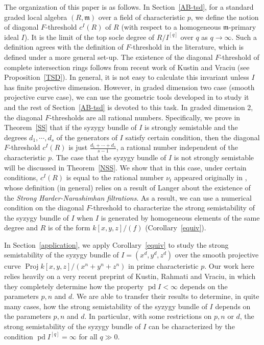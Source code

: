 \documentclass[draft]{amsart}
\theoremstyle{definition}
\numberwithin{equation}{theorem}
\begin{document}
The organization of this paper is as follows. In Section~\ref{AB-tsd}, for a standard graded local algebra $(R, {\mathfrak{m}})$ over a field of characteristic $p$, we define the notion of diagonal $F$-threshold $c^I(R)$ of $R$ (with respect to a homogeneous ${\mathfrak{m}}$-primary ideal $I$). It is the limit of the top socle degree of $R/I^{[q]}$ over $q$ as $q \to {{\infty}}$. Such a definition agrees with the definition of $F$-threshold in the literature, which is defined under a more general set-up. The existence of the diagonal $F$-threshold of complete intersection rings follows from recent work of Kustin and Vraciu (see Proposition~\ref{TSD}). In general, it is not easy to calculate this invariant unless $I$ has finite projective dimension. However, in graded dimension two case (smooth projective curve case), we can use the geometric tools developed in \cite{B2} to study it and the rest of Section~\ref{AB-tsd} is devoted to this task. In graded dimension 2, the diagonal $F$-thresholds are all rational numbers. Specifically, we prove in Theorem~\ref{SS} that if the syzygy bundle of $I$ is strongly semistable and the degrees $d_1, \cdots, d_s$ of the generators of $I$ satisfy certain condition, then the diagonal $F$-threshold $c^I(R)$ is just $\frac{d_1+\cdots + d_s}{s-1}$, a rational number independent of the characteristic $p$. The case that the syzygy bundle of $I$ is not strongly semistable will be discussed in Theorem~\ref{NSS}. We show that in this case, under certain conditions, $c^I(R)$ is equal to the rational number $\nu_t$ appeared originally in \cite{B2},  whose definition (in general) relies on a result of Langer about the existence of the \textit{Strong Harder-Narashimhan filtrations}. As a result, we can use a numerical condition on the diagonal $F$-threshold to characterize the strong semistability of the syzygy bundle of $I$ when $I$ is generated by homogeneous elements of the same degree and $R$ is of the form $k[x,y,z]/(f)$ (Corollary~\ref{equiv}).

In Section~\ref{application}, we apply Corollary~\ref{equiv} to study the strong semistability of the syzygy bundle of $I=(x^d, y^d,z^d)$ over the smooth projective curve ${\mathop{\mathrm{Proj}}\nolimits} k[x,y,z]/(x^n+y^n+z^n)$ in prime characteristic $p$. Our work here relies heavily on a very recent preprint \cite{KRV} of Kustin, Rahmati and Vraciu, in which they completely determine how the property ${\mathop{\mathrm{pd}}\nolimits} I <{{\infty}}$ depends on the parameters $p,n$ and $d$. We are able to transfer their results to determine, in quite many cases, how the strong semistability of the syzygy bundle of $I$ depends on the parameters $p,n$ and $d$. In particular, with some restrictions on $p,n$ or $d$, the strong semistability of the syzygy bundle of $I$ can be characterized by the condition ${\mathop{\mathrm{pd}}\nolimits} I^{[q]}={{\infty}}$ for all $q\gg0$.
\end{document}
